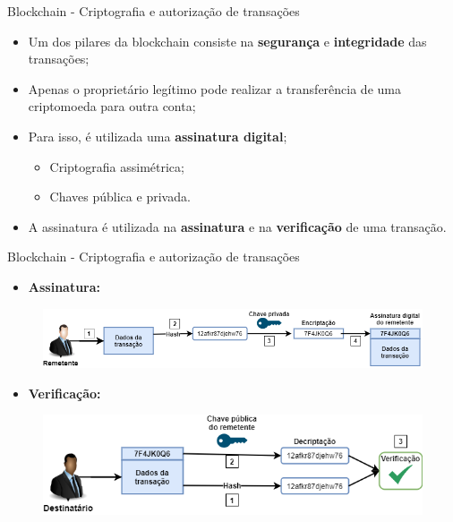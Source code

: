 \begin{frame}{Blockchain - Criptografia e autorização de transações}
    \begin{itemize}
        \item Um dos pilares da blockchain consiste na \textbf{segurança} e \textbf{integridade} das transações;
        \item Apenas o proprietário legítimo pode realizar a transferência de uma criptomoeda para outra conta;
        \item Para isso, é utilizada uma \textbf{assinatura digital};
        \begin{itemize}
            \item Criptografia assimétrica;
            \item Chaves pública e privada.
        \end{itemize}
        \item A assinatura é utilizada na \textbf{assinatura} e na \textbf{verificação} de uma transação.
    \end{itemize}
\end{frame}

\begin{frame}{Blockchain - Criptografia e autorização de transações}
    \begin{itemize}
        \item \textbf{Assinatura:}
    \end{itemize}
    \begin{figure}[!htb]
     \centering
     \includegraphics[scale=0.4]{figuras/blockchain/remetente_assinatura_digital.png}
    \end{figure}
    \begin{itemize}
        \item \textbf{Verificação:}
    \end{itemize}    
    \begin{figure}[!htb]
     \centering
     \includegraphics[scale=0.4]{figuras/blockchain/verifica_assinatura_digital.png}
    \end{figure}
\end{frame} 

